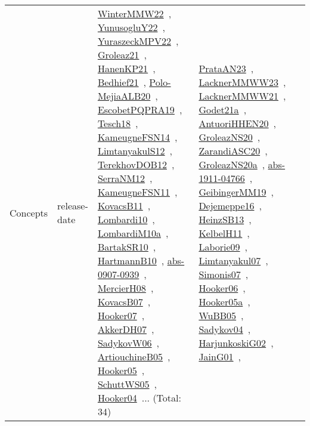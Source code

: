 {\begin{longtable}{lp{3cm}>{\raggedright\arraybackslash}p{6cm}>{\raggedright\arraybackslash}p{6cm}>{\raggedright\arraybackslash}p{8cm}}
Concepts & release-date & \href{works/WinterMMW22.pdf}{WinterMMW22}~\cite{WinterMMW22}, \href{works/YunusogluY22.pdf}{YunusogluY22}~\cite{YunusogluY22}, \href{works/YuraszeckMPV22.pdf}{YuraszeckMPV22}~\cite{YuraszeckMPV22}, \href{works/Groleaz21.pdf}{Groleaz21}~\cite{Groleaz21}, \href{works/HanenKP21.pdf}{HanenKP21}~\cite{HanenKP21}, \href{works/Bedhief21.pdf}{Bedhief21}~\cite{Bedhief21}, \href{works/Polo-MejiaALB20.pdf}{Polo-MejiaALB20}~\cite{Polo-MejiaALB20}, \href{works/EscobetPQPRA19.pdf}{EscobetPQPRA19}~\cite{EscobetPQPRA19}, \href{works/Tesch18.pdf}{Tesch18}~\cite{Tesch18}, \href{works/KameugneFSN14.pdf}{KameugneFSN14}~\cite{KameugneFSN14}, \href{works/LimtanyakulS12.pdf}{LimtanyakulS12}~\cite{LimtanyakulS12}, \href{works/TerekhovDOB12.pdf}{TerekhovDOB12}~\cite{TerekhovDOB12}, \href{works/SerraNM12.pdf}{SerraNM12}~\cite{SerraNM12}, \href{works/KameugneFSN11.pdf}{KameugneFSN11}~\cite{KameugneFSN11}, \href{works/KovacsB11.pdf}{KovacsB11}~\cite{KovacsB11}, \href{works/Lombardi10.pdf}{Lombardi10}~\cite{Lombardi10}, \href{works/LombardiM10a.pdf}{LombardiM10a}~\cite{LombardiM10a}, \href{works/BartakSR10.pdf}{BartakSR10}~\cite{BartakSR10}, \href{works/HartmannB10.pdf}{HartmannB10}~\cite{HartmannB10}, \href{works/abs-0907-0939.pdf}{abs-0907-0939}~\cite{abs-0907-0939}, \href{works/MercierH08.pdf}{MercierH08}~\cite{MercierH08}, \href{works/KovacsB07.pdf}{KovacsB07}~\cite{KovacsB07}, \href{works/Hooker07.pdf}{Hooker07}~\cite{Hooker07}, \href{works/AkkerDH07.pdf}{AkkerDH07}~\cite{AkkerDH07}, \href{works/SadykovW06.pdf}{SadykovW06}~\cite{SadykovW06}, \href{works/ArtiouchineB05.pdf}{ArtiouchineB05}~\cite{ArtiouchineB05}, \href{works/Hooker05.pdf}{Hooker05}~\cite{Hooker05}, \href{works/SchuttWS05.pdf}{SchuttWS05}~\cite{SchuttWS05}, \href{works/Hooker04.pdf}{Hooker04}~\cite{Hooker04}... (Total: 34) & \href{works/PrataAN23.pdf}{PrataAN23}~\cite{PrataAN23}, \href{works/LacknerMMWW23.pdf}{LacknerMMWW23}~\cite{LacknerMMWW23}, \href{works/LacknerMMWW21.pdf}{LacknerMMWW21}~\cite{LacknerMMWW21}, \href{works/Godet21a.pdf}{Godet21a}~\cite{Godet21a}, \href{works/AntuoriHHEN20.pdf}{AntuoriHHEN20}~\cite{AntuoriHHEN20}, \href{works/GroleazNS20.pdf}{GroleazNS20}~\cite{GroleazNS20}, \href{works/ZarandiASC20.pdf}{ZarandiASC20}~\cite{ZarandiASC20}, \href{works/GroleazNS20a.pdf}{GroleazNS20a}~\cite{GroleazNS20a}, \href{works/abs-1911-04766.pdf}{abs-1911-04766}~\cite{abs-1911-04766}, \href{works/GeibingerMM19.pdf}{GeibingerMM19}~\cite{GeibingerMM19}, \href{works/Dejemeppe16.pdf}{Dejemeppe16}~\cite{Dejemeppe16}, \href{works/HeinzSB13.pdf}{HeinzSB13}~\cite{HeinzSB13}, \href{works/KelbelH11.pdf}{KelbelH11}~\cite{KelbelH11}, \href{works/Laborie09.pdf}{Laborie09}~\cite{Laborie09}, \href{works/Limtanyakul07.pdf}{Limtanyakul07}~\cite{Limtanyakul07}, \href{works/Simonis07.pdf}{Simonis07}~\cite{Simonis07}, \href{works/Hooker06.pdf}{Hooker06}~\cite{Hooker06}, \href{works/Hooker05a.pdf}{Hooker05a}~\cite{Hooker05a}, \href{works/WuBB05.pdf}{WuBB05}~\cite{WuBB05}, \href{works/Sadykov04.pdf}{Sadykov04}~\cite{Sadykov04}, \href{works/HarjunkoskiG02.pdf}{HarjunkoskiG02}~\cite{HarjunkoskiG02}, \href{works/JainG01.pdf}{JainG01}~\cite{JainG01}, 
\end{longtable}}

